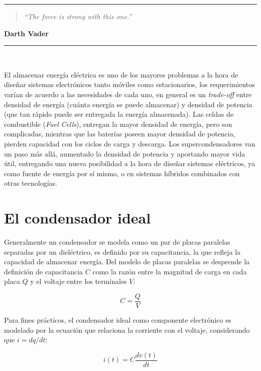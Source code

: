 \noindent
\rule{\linewidth}{1 pt}
\begin{flushright}
	\begin{quotation}
		\small{
			\textit{``The force is strong with this one.''}}
	\end{quotation}
	\bf{Darth Vader}
\end{flushright}
\noindent
\rule{\linewidth}{1 pt}\\
\vfill

El almacenar energía eléctrica es uno de los mayores problemas a la hora de diseñar sistemas electrónicos tanto móviles como estacionarios, los requerimientos varían de acuerdo a las necesidades de cada uno, en general es un \textit{trade-off} entre densidad de energía (cuánta energía se puede almacenar) y densidad de potencia (que tan rápido puede ser entregada la energía almacenada). Las celdas de combustible (\textit{Fuel Cells}), entregan la mayor densidad de energía, pero son complicadas, mientras que las baterías poseen mayor densidad de potencia, pierden capacidad con los ciclos de carga y descarga. Los supercondensadores van un paso más allá, aumentado la densidad de potencia y aportando mayor vida útil, entregando una nueva posibilidad a la hora de diseñar sistemas eléctricos, ya como fuente de energía por sí mismo, o en sistemas híbridos combinados con otras tecnologías\cite{Thounthong2009}.
\section{El condensador ideal}
Generalmente un condensador se modela como un par de placas paralelas separadas por un dieléctrico, es definido por su capacitancia, la que refleja la capacidad de almacenar energía. Del modelo de placas paralelas se desprende la definición de capacitancia $C$ como la razón entre la magnitud de carga en cada placa $Q$ y el voltaje entre los terminales $V$:

\begin{equation}
	C = \frac{Q}{V}
\end{equation}

Para fines prácticos, el condensador ideal como componente electrónico es modelado por la ecuación que relaciona la corriente con el voltaje, considerando que $i = dq/dt$:

\begin{equation}
	i(t) = C \frac{dv(t)}{dt}
\end{equation}

